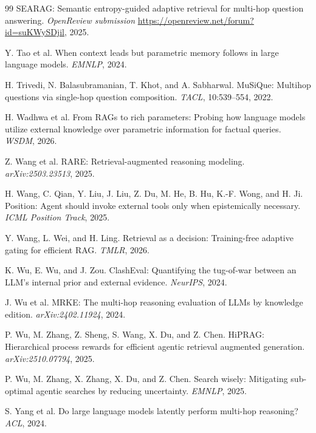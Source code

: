 \documentclass[10pt,letterpaper]{article}
\begin{document}
\begin{thebibliography}{99}
{SEARAG}: Semantic entropy-guided adaptive retrieval for multi-hop question answering.
\emph{OpenReview submission} \url{https://openreview.net/forum?id=suKWySDjil}, 2025.

Y. Tao et al.
When context leads but parametric memory follows in large language models.
\emph{EMNLP}, 2024.

H. Trivedi, N. Balasubramanian, T. Khot, and A. Sabharwal.
{MuSiQue}: Multihop questions via single-hop question composition.
\emph{TACL}, 10:539--554, 2022.

H. Wadhwa et al.
From {RAGs} to rich parameters: Probing how language models utilize external knowledge over parametric information for factual queries.
\emph{WSDM}, 2026.

Z. Wang et al.
{RARE}: Retrieval-augmented reasoning modeling.
\emph{arXiv:2503.23513}, 2025.

H. Wang, C. Qian, Y. Liu, J. Liu, Z. Du, M. He, B. Hu, K.-F. Wong, and H. Ji.
Position: Agent should invoke external tools only when epistemically necessary.
\emph{ICML Position Track}, 2025.

Y. Wang, L. Wei, and H. Ling.
Retrieval as a decision: Training-free adaptive gating for efficient {RAG}.
\emph{TMLR}, 2026.

K. Wu, E. Wu, and J. Zou.
{ClashEval}: Quantifying the tug-of-war between an {LLM}'s internal prior and external evidence.
\emph{NeurIPS}, 2024.

J. Wu et al.
{MRKE}: The multi-hop reasoning evaluation of {LLMs} by knowledge edition.
\emph{arXiv:2402.11924}, 2024.

P. Wu, M. Zhang, Z. Sheng, S. Wang, X. Du, and Z. Chen.
{HiPRAG}: Hierarchical process rewards for efficient agentic retrieval augmented generation.
\emph{arXiv:2510.07794}, 2025.

P. Wu, M. Zhang, X. Zhang, X. Du, and Z. Chen.
Search wisely: Mitigating sub-optimal agentic searches by reducing uncertainty.
\emph{EMNLP}, 2025.

S. Yang et al.
Do large language models latently perform multi-hop reasoning?
\emph{ACL}, 2024.


\end{thebibliography}
\end{document}
